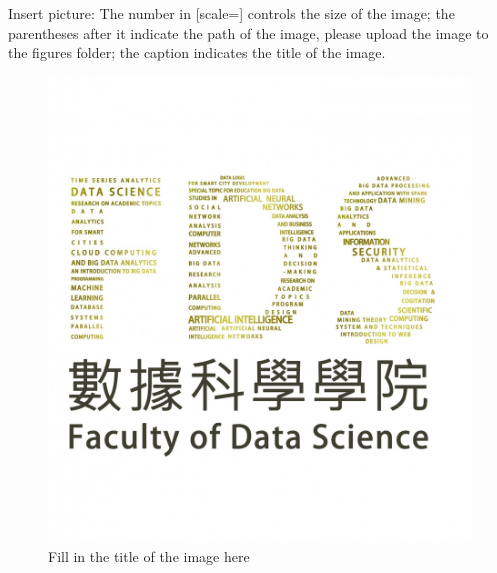\documentclass[12pt,hyperref,a4paper,UTF8]{article}
\begin{document}
Insert picture:
The number in [scale=] controls the size of the image; the parentheses after it indicate the path of the image, please upload the image to the figures folder; the caption indicates the title of the image.
\begin{figure}[h]
    \centering
    \includegraphics[scale=0.1]{figures/FDS logo.jpg}
    \caption{Fill in the title of the image here}
\end{figure}
\end{document}
